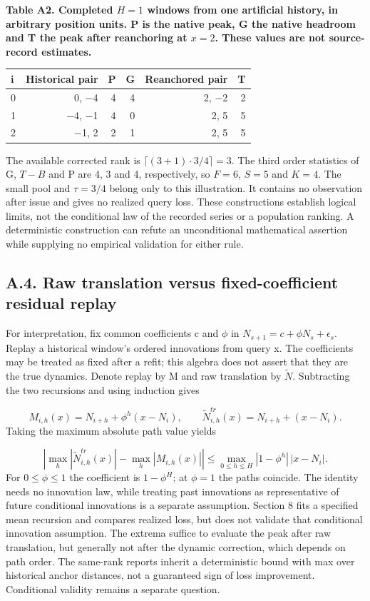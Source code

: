 \documentclass[10pt,a4paper]{article}
\begin{document}
\begin{center}
\begin{minipage}{\linewidth}
\small\textbf{Table A2. Completed \(H=1\) windows from one artificial history, in arbitrary position units. P is the native peak, G the native headroom and T the peak after reanchoring at \(x=2\). These values are not source-record estimates.}\par\medskip
\centering\fontsize{8}{10}\selectfont
\begin{tabular}{lrrrrr}
\toprule
i & Historical pair & P & G & Reanchored pair & T \\
\midrule
0 & 0, \(-\)4 & 4 & 4 & 2, \(-\)2 & 2 \\
1 & \(-\)4, \(-\)1 & 4 & 0 & 2, 5 & 5 \\
2 & \(-\)1, 2 & 2 & 1 & 2, 5 & 5 \\
\bottomrule
\end{tabular}
\end{minipage}
\end{center}
The available corrected rank is \(\lceil(3+1)\cdot3/4\rceil=3\). The third order statistics of G, \(T-B\) and P are 4, 3 and 4, respectively, so \(F=6\), \(S=5\) and \(K=4\). The small pool and \(\tau=3/4\) belong only to this illustration. It contains no observation after issue and gives no realized query loss. These constructions establish logical limits, not the conditional law of the recorded series or a population ranking. A deterministic construction can refute an unconditional mathematical assertion while supplying no empirical validation for either rule.

\subsection*{A.4. Raw translation versus fixed-coefficient residual replay}
For interpretation, fix common coefficients c and \(\phi\) in \(N_{s+1}=c+\phi N_s+\epsilon_s\). Replay a historical window's ordered innovations from query x. The coefficients may be treated as fixed after a refit; this algebra does not assert that they are the true dynamics. Denote replay by M and raw translation by \(\widetilde N\). Subtracting the two recursions and using induction gives

\[
M_{i,h}(x)=N_{i+h}+\phi^h(x-N_i),\qquad \widetilde N^{tr}_{i,h}(x)=N_{i+h}+(x-N_i).
\]
Taking the maximum absolute path value yields

\[
\left|\max_h|\widetilde N^{tr}_{i,h}(x)|-\max_h|M_{i,h}(x)|\right|\le\max_{0\le h\le H}|1-\phi^h|\,|x-N_i|.
\]
For \(0\le\phi\le1\) the coefficient is \(1-\phi^H\); at \(\phi=1\) the paths coincide. The identity needs no innovation law, while treating past innovations as representative of future conditional innovations is a separate assumption. Section 8 fits a specified mean recursion and compares realized loss, but does not validate that conditional innovation assumption. The extrema suffice to evaluate the peak after raw translation, but generally not after the dynamic correction, which depends on path order. The same-rank reports inherit a deterministic bound with max over historical anchor distances, not a guaranteed sign of loss improvement. Conditional validity remains a separate question.
\end{document}
